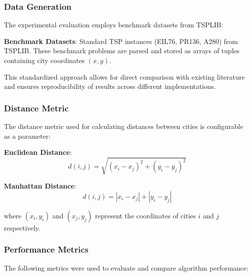 \documentclass{scrartcl}
\begin{document}
\subsubsection{Data Generation}
The experimental evaluation employs benchmark datasets from TSPLIB:

\textbf{Benchmark Datasets}: Standard TSP instances (EIL76, PR136, A280) from TSPLIB. These benchmark problems are parsed and stored as arrays of tuples containing city coordinates $(x, y)$.

This standardized approach allows for direct comparison with existing literature and ensures reproducibility of results across different implementations.

\subsubsection{Distance Metric}
The distance metric used for calculating distances between cities is configurable as a parameter:

\textbf{Euclidean Distance}: 
\begin{equation}
d(i,j) = \sqrt{(x_i - x_j)^2 + (y_i - y_j)^2}
\end{equation}

\textbf{Manhattan Distance}: 
\begin{equation}
d(i,j) = |x_i - x_j| + |y_i - y_j|
\end{equation}

where $(x_i, y_i)$ and $(x_j, y_j)$ represent the coordinates of cities $i$ and $j$ respectively.

\subsubsection{Performance Metrics}
The following metrics were used to evaluate and compare algorithm performance:
\end{document}
